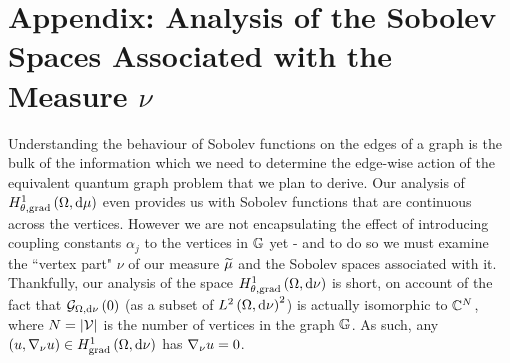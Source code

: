 \section{Appendix: Analysis of the Sobolev Spaces Associated with the Measure $\nu$} \label{app:VertexAnalysis}
Understanding the behaviour of Sobolev functions on the edges of a graph is the bulk of the information which we need to determine the edge-wise action of the equivalent quantum graph problem that we plan to derive.
Our analysis of $H^1_{\theta, \mathrm{grad}}\left( \Omega, \mathrm{d}\mu \right)$ even provides us with Sobolev functions that are continuous across the vertices.
However we are not encapsulating the effect of introducing coupling constants $\alpha_j$ to the vertices in $\mathbb{G}$ yet - and to do so we must examine the ``vertex part" $\nu$ of our measure $\widetilde{\mu}$ and the Sobolev spaces associated with it.
Thankfully, our analysis of the space $H^1_{\theta, \mathrm{grad}}\left( \Omega, \mathrm{d}\nu \right)$ is short, on account of the fact that $\mathcal{G}_{ \Omega, \mathrm{d}\nu}\left( 0 \right)$ (as a subset of $L^{2}\left( \Omega,\mathrm{d}\nu \right)^2$) is actually isomorphic to $\mathbb{C}^N$, where $N=\left\lvert \mathcal{V} \right\rvert$ is the number of vertices in the graph $\mathbb{G}$.
As such, any $\left( u,\nabla_{\nu}u \right)\in H^1_\mathrm{grad}\left( \Omega, \mathrm{d}\nu \right)$ has $\nabla_{\nu}u=0$.

